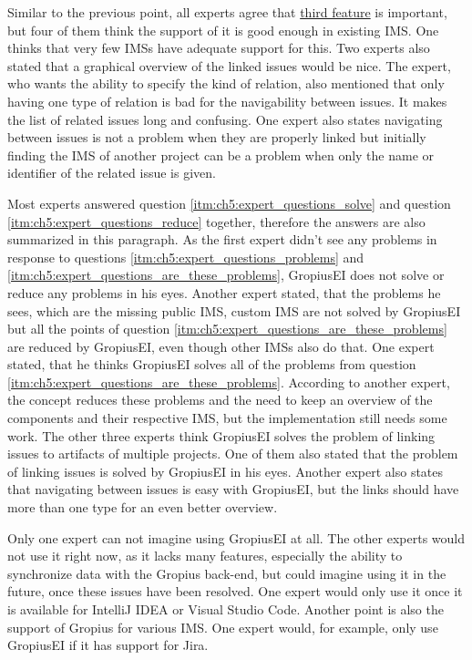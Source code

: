 Similar to the previous point, all experts agree that \hyperref[itm:ch5:expert_questions_are_these_problems_3]{third feature} is important, 
but four of them think the support of it is good enough in existing \gls{IMS}.
One thinks that very few \glspl{IMS} have adequate support for this.
Two experts also stated that a graphical overview of the linked issues would be nice.
The expert, who wants the ability to specify the kind of relation, also mentioned that only having one type of relation is bad for the navigability between issues. It makes the list of related issues long and confusing.
One expert also states navigating between issues is not a problem when they are properly linked but initially finding the \gls{IMS} of another project can be a problem when only the name or identifier of the related issue is given.

Most experts answered question \ref{itm:ch5:expert_questions_solve} and question \ref{itm:ch5:expert_questions_reduce} together, 
therefore the answers are also summarized in this paragraph.
As the first expert didn't see any problems in response to questions \ref{itm:ch5:expert_questions_problems} and \ref{itm:ch5:expert_questions_are_these_problems}, \gls{GropiusEI} does not solve or reduce any problems in his eyes.
Another expert stated, that the problems he sees, which are the missing public \gls{IMS}, custom \gls{IMS} are not solved by \gls{GropiusEI} but all the points of question \ref{itm:ch5:expert_questions_are_these_problems} are reduced by \gls{GropiusEI}, even though other \glspl{IMS} also do that.
One expert stated, that he thinks \gls{GropiusEI} solves all of the problems from question \ref{itm:ch5:expert_questions_are_these_problems}.
According to another expert, the concept reduces these problems and the need to keep an overview of the components and their respective \gls{IMS}, but the implementation still needs some work.
The other three experts think \gls{GropiusEI} solves the problem of linking issues to artifacts of multiple projects.
One of them also stated that the problem of linking issues is solved by \gls{GropiusEI} in his eyes.
Another expert also states that navigating between issues is easy with \gls{GropiusEI}, but the links should have more than one type for an even better overview.

Only one expert can not imagine using \gls{GropiusEI} at all.
The other experts would not use it right now, as it lacks many features, especially the ability to synchronize data with the \gls{Gropius} back-end,
but could imagine using it in the future, once these issues have been resolved.
One expert would only use it once it is available for IntelliJ IDEA or Visual Studio Code.
Another point is also the support of \gls{Gropius} for various \gls{IMS}.
One expert would, for example, only use \gls{GropiusEI} if it has support for Jira.

